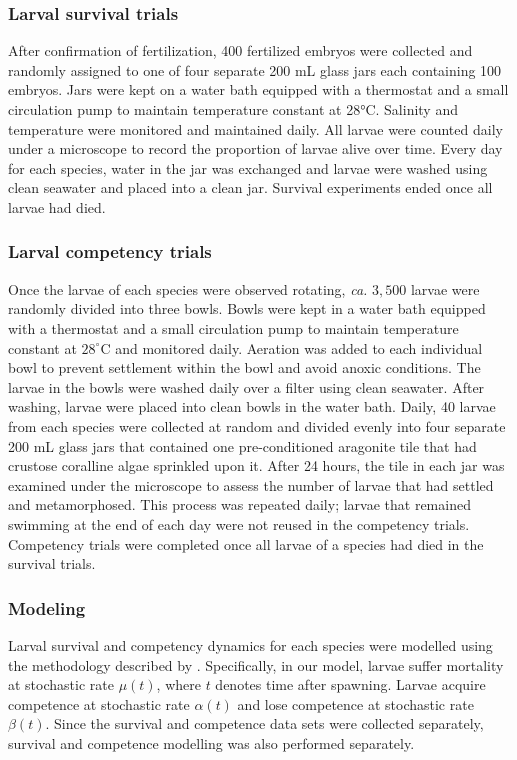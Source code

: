 \documentclass[preprint,12pt,authoryear]{elsarticle}
\begin{document}
	\subsubsection{Larval survival trials}
	After confirmation of fertilization, 400 fertilized embryos were collected and randomly assigned to one of four separate 200 mL glass jars each containing 100 embryos. Jars were kept on a water bath equipped with a thermostat and a small circulation pump to maintain temperature constant at 28°C. Salinity and temperature were monitored and maintained daily. All larvae were counted daily under a microscope to record the proportion of larvae alive over time. Every day for each species, water in the jar was exchanged and larvae were washed using clean seawater and placed into a clean jar. Survival experiments ended once all larvae had died. 

	\subsubsection{Larval competency trials}
	Once the larvae of each species were observed rotating, \textit{ca.} $3,500$ larvae were randomly divided into three bowls. Bowls were kept in a water bath equipped with a thermostat and a small circulation pump to maintain temperature constant at $28^\circ$C and monitored daily. Aeration was added to each individual bowl to prevent settlement within the bowl and avoid anoxic conditions. The larvae in the bowls were washed daily over a filter using clean seawater. After washing, larvae were placed into clean bowls in the water bath. Daily, 40 larvae from each species were collected at random and divided evenly into four separate 200 mL glass jars that contained one pre-conditioned aragonite tile that had crustose coralline algae sprinkled upon it. After 24 hours, the tile in each jar was examined under the microscope to assess the number of larvae that had settled and metamorphosed. This process was repeated daily; larvae that remained swimming at the end of each day were not reused in the competency trials. Competency trials were completed once all larvae of a species had died in the survival trials. 

	\subsubsection{Modeling}
	Larval survival and competency dynamics for each species were modelled using the methodology described by \cite{figueiredo2022global}. Specifically, in our model, larvae suffer mortality at stochastic rate $\mu(t)$, where $t$ denotes time after spawning. Larvae acquire competence at stochastic rate $\alpha(t)$ and lose competence at stochastic rate $\beta(t)$. Since the survival and competence data sets were collected separately, survival and competence modelling was also performed separately.
\end{document}
